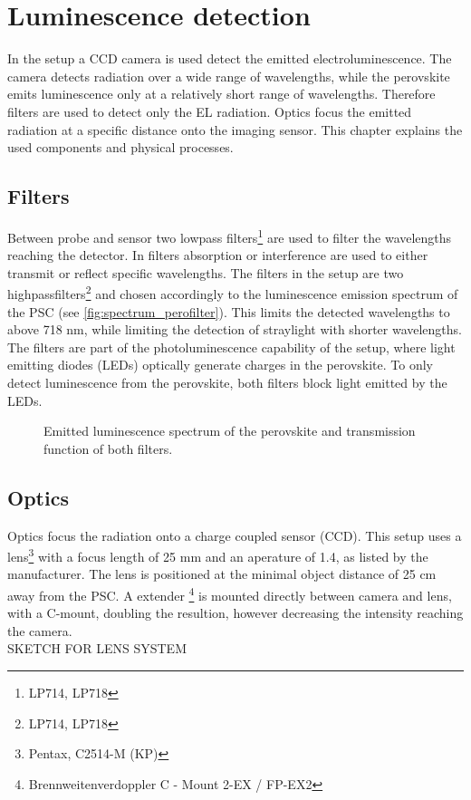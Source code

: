 \section{Luminescence detection}\label{sec:luminescencedetection}
In the setup a CCD camera is used detect the emitted electroluminescence. The camera detects radiation over a wide range of wavelengths, while the perovskite emits luminescence only at a relatively short range of wavelengths. Therefore filters are used to detect only the EL radiation. Optics focus the emitted radiation at a specific distance onto the imaging sensor. This chapter explains the used components and physical processes.
\subsection{Filters}
Between probe and sensor two lowpass filters\footnote{LP714, LP718} are used to filter the wavelengths reaching the detector. In filters absorption or interference are used to either transmit or reflect specific wavelengths. The filters in the setup are two highpassfilters\footnote{LP714, LP718} and chosen accordingly to the luminescence emission spectrum of the PSC (see \autoref{fig:spectrum_perofilter}). This limits the detected wavelengths to above 718 nm, while limiting the detection of straylight with shorter wavelengths. The filters are part of the photoluminescence capability of the setup, where light emitting diodes (LEDs) optically generate charges in the perovskite. To only detect luminescence from the perovskite, both filters block light emitted by the LEDs.

\begin{figure}[h]
	\centering
	
	\caption{Emitted luminescence spectrum of the perovskite and transmission function of both filters. }
	\label{fig:spectrum_perofilter}
\end{figure}
\subsection{Optics}
Optics focus the radiation onto a charge coupled sensor (CCD). This setup uses a lens\footnote{Pentax, C2514-M (KP)} with a focus length of 25 mm and an aperature of 1.4, as listed by the manufacturer. The lens is positioned at the minimal object distance of  25 cm away from the PSC. A extender \footnote{Brennweitenverdoppler C - Mount 2-EX / FP-EX2} is mounted directly between camera and lens, with a C-mount, doubling the resultion, however decreasing the intensity reaching the camera.
\\
SKETCH FOR LENS SYSTEM
\\


